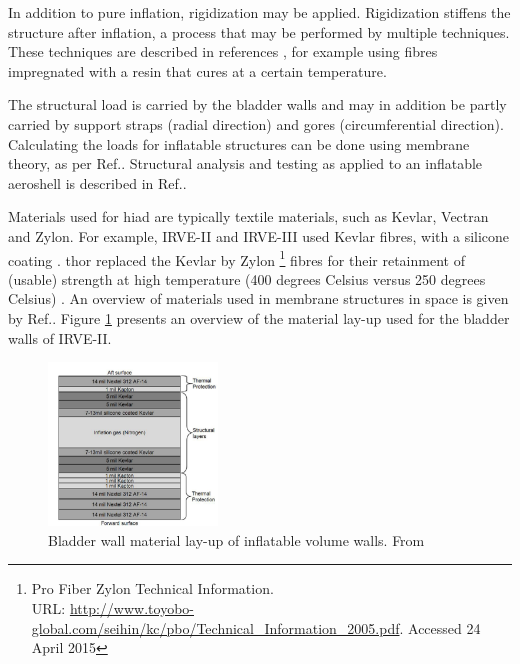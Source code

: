 In addition to pure inflation, rigidization may be applied. Rigidization stiffens the structure after inflation, a process that may be performed by multiple techniques. These techniques are described in references \cite{Freeland1998,Jenkins2001}, for example using fibres impregnated with a resin that cures at a certain temperature. 

The structural load is carried by the bladder walls and may in addition be partly carried by support straps (radial direction) and gores (circumferential direction). Calculating the loads for inflatable structures can be done using membrane theory, as per Ref.\cite{Young2002}. Structural analysis and testing as applied to an inflatable aeroshell is described in Ref.\cite{Lindell2006}.

Materials used for \gls{hiad} are typically textile materials, such as Kevlar, Vectran and Zylon. For example, IRVE-II and IRVE-III used Kevlar fibres, with a silicone coating \cite{Dillman2012a}. \gls{thor} replaced the Kevlar by Zylon \footnote{Pro Fiber Zylon Technical Information. \\ URL: \url{http://www.toyobo-global.com/seihin/kc/pbo/Technical\_Information\_2005.pdf}. Accessed 24 April 2015} fibres for their retainment of (usable) strength at high temperature (400 degrees Celsius versus 250 degrees Celsius) \cite{Dillman2014}. An overview of materials used in membrane structures in space is given by Ref.\cite{Jenkins2001}. Figure \ref{fig:matlayup} presents an overview of the material lay-up used for the bladder walls of IRVE-II.

\begin{figure}[H]
\centering
\includegraphics[width = 0.4\textwidth]{Figure/IRVE2_bladder_mat.PNG}
\caption{Bladder wall material lay-up of inflatable volume walls. From \cite[p.2]{Dillman2010}}
\label{fig:matlayup}
\end{figure}

